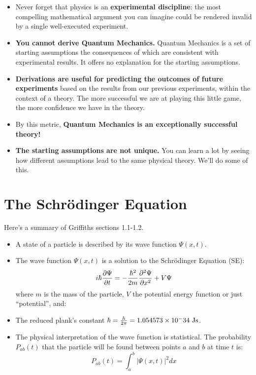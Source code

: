 \documentclass[12pt]{book}
\begin{document}
\begin{itemize}

\item Never forget that physics is an {\bf experimental discipline}: the most compelling mathematical argument you can imagine could be rendered invalid by a single well-executed experiment.  

\item {\bf You cannot derive Quantum Mechanics.}  Quantum Mechanics is a set
of starting assumptions the consequences of which are consistent with experimental results.
It offers no explanation for the starting assumptions.

\item {\bf Derivations are useful for predicting the outcomes of future
experiments} based on the results from our previous experiments, within
the context of a theory.  The more successful we are at playing this little
game, the more confidence we have in the theory.

\item By this metric, {\bf Quantum Mechanics is an exceptionally successful theory!}

\item {\bf The starting assumptions are not unique.} You can learn
a lot by seeing how different assumptions lead to the same physical
theory.  We'll do some of this.

\end{itemize}

\section{The Schr\"odinger Equation}

Here's a summary of Griffiths sections 1.1-1.2.

\begin{itemize}

\item A state of a particle is described by its wave function $\Psi(x,t)$.

\item The wave function $\Psi(x,t)$ is a solution to the Schr\"odinger Equation (SE):
\begin{equation}
\label{eqn:se}
i \hbar  \frac{\partial \Psi}{\partial t}  = - \frac{\hbar^2}{2 m} \frac{\partial^2 \Psi}{\partial x^2}  + V \Psi
\end{equation}
where $m$ is the mass of the particle, $V$ the potential energy function or just ``potential'', and:  

\item The reduced plank's constant $\hbar = \frac{h}{2 \pi} = 1.054573 \times 10^-34~\rm Js$.

\item The physical interpretation of the wave function is statistical.  The probability $P_{ab}(t)$ that the particle will be found between points $a$ and $b$ at time $t$ is:
\begin{equation}
\label{eqn:prob}
P_{ab}(t) = \int_a^b |\Psi(x,t)|^2 dx
\end{equation}
\end{itemize}
\end{document}
